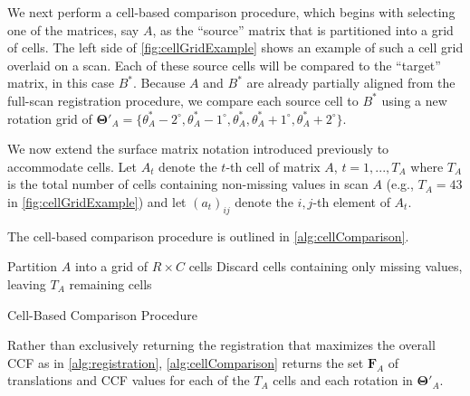 \documentclass[preprint]{JASA}
\begin{document}
We next perform a cell-based comparison procedure, which begins with
selecting one of the matrices, say \(A\), as the ``source'' matrix that
is partitioned into a grid of cells. The left side of
\autoref{fig:cellGridExample} shows an example of such a cell grid
overlaid on a scan. Each of these source cells will be compared to the
``target'' matrix, in this case \(B^*\). Because \(A\) and \(B^*\) are
already partially aligned from the full-scan registration procedure, we
compare each source cell to \(B^*\) using a new rotation grid of
\(\pmb{\Theta}'_A = \{\theta^*_A - 2^\circ, \theta^*_A - 1^\circ,\theta^*_A,\theta^*_A + 1^\circ,\theta^*_A + 2^\circ\}\).

We now extend the surface matrix notation introduced previously to
accommodate cells. Let \(A_{t}\) denote the \(t\)-th cell of matrix
\(A\), \(t = 1,...,T_A\) where \(T_A\) is the total number of cells
containing non-missing values in scan \(A\) (e.g., \(T_A = 43\) in
\autoref{fig:cellGridExample}) and let \((a_t)_{ij}\) denote the
\(i,j\)-th element of \(A_t\).

The cell-based comparison procedure is outlined in
\autoref{alg:cellComparison}.

\begin{algorithm}[H]
Partition $A$ into a grid of $R \times C$ cells\;
Discard cells containing only missing values, leaving $T_A$ remaining cells\;
\caption{Cell-Based Comparison Procedure}
\label{alg:cellComparison}
\end{algorithm}

Rather than exclusively returning the registration that maximizes the
overall CCF as in \autoref{alg:registration},
\autoref{alg:cellComparison} returns the set \(\pmb{F}_A\) of
translations and CCF values for each of the \(T_A\) cells and each
rotation in \(\pmb{\Theta}'_A\).
\end{document}
